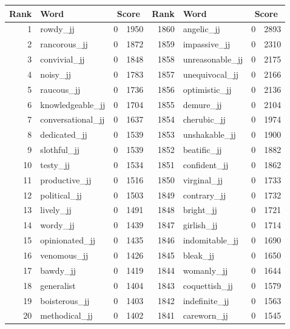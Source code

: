 \begin{table}[tbp]
    \begin{tabular}{| rlr@{.}l | rlr@{.}l |}
    \hline
    \textbf{Rank} & \textbf{Word} & \multicolumn{2}{c|}{\textbf{Score}} & \textbf{Rank} & \textbf{Word} & \multicolumn{2}{c|}{\textbf{Score}} \\
    \hline
    1 & rowdy\_jj & 0 & 1950    &    1860 & angelic\_jj & 0 & 2893 \\
    2 & rancorous\_jj & 0 & 1872    &    1859 & impassive\_jj & 0 & 2310 \\
    3 & convivial\_jj & 0 & 1848    &    1858 & unreasonable\_jj & 0 & 2175 \\
    4 & noisy\_jj & 0 & 1783    &    1857 & unequivocal\_jj & 0 & 2166 \\
    5 & raucous\_jj & 0 & 1736    &    1856 & optimistic\_jj & 0 & 2136 \\
    6 & knowledgeable\_jj & 0 & 1704    &    1855 & demure\_jj & 0 & 2104 \\
    7 & conversational\_jj & 0 & 1637    &    1854 & cherubic\_jj & 0 & 1974 \\
    8 & dedicated\_jj & 0 & 1539    &    1853 & unshakable\_jj & 0 & 1900 \\
    9 & slothful\_jj & 0 & 1539    &    1852 & beatific\_jj & 0 & 1882 \\
    10 & testy\_jj & 0 & 1534    &    1851 & confident\_jj & 0 & 1862 \\
    11 & productive\_jj & 0 & 1516    &    1850 & virginal\_jj & 0 & 1733 \\
    12 & political\_jj & 0 & 1503    &    1849 & contrary\_jj & 0 & 1732 \\
    13 & lively\_jj & 0 & 1491    &    1848 & bright\_jj & 0 & 1721 \\
    14 & wordy\_jj & 0 & 1439    &    1847 & girlish\_jj & 0 & 1714 \\
    15 & opinionated\_jj & 0 & 1435    &    1846 & indomitable\_jj & 0 & 1690 \\
    16 & venomous\_jj & 0 & 1426    &    1845 & bleak\_jj & 0 & 1650 \\
    17 & bawdy\_jj & 0 & 1419    &    1844 & womanly\_jj & 0 & 1644 \\
    18 & generalist & 0 & 1404    &    1843 & coquettish\_jj & 0 & 1579 \\
    19 & boisterous\_jj & 0 & 1403    &    1842 & indefinite\_jj & 0 & 1563 \\
    20 & methodical\_jj & 0 & 1402    &    1841 & careworn\_jj & 0 & 1545 \\

\end{tabular}
\end{table}
